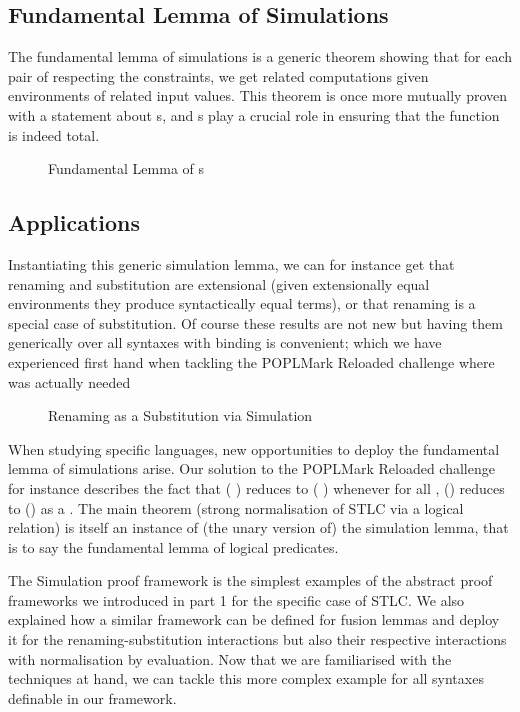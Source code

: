
\subsection{Fundamental Lemma of Simulations}

The fundamental lemma of simulations is a generic theorem showing that for
each pair of  respecting the  constraints, we
get related computations given environments of related input values. This
theorem is once more mutually proven with a statement about s,
and s play a crucial role in ensuring that the function is indeed total.

\begin{figure}[h]
\caption{Fundamental Lemma of s}
\end{figure}

\subsection{Applications}

Instantiating this generic simulation lemma, we can for instance get
that renaming and substitution are extensional (given extensionally
equal environments they produce syntactically equal terms), or that
renaming is a special case of substitution. Of course these results
are not new but having them generically over all syntaxes with binding
is convenient; which we have experienced first hand when tackling the
POPLMark Reloaded challenge where  was actually needed

\begin{figure}[h]
\caption{Renaming as a Substitution via Simulation}
\end{figure}

When studying specific languages, new opportunities to deploy the
fundamental lemma of simulations arise. Our solution to the POPLMark
Reloaded challenge for instance describes the fact that ({  })
reduces to ({  }) whenever for all ,
() reduces to () as a .
The main theorem (strong normalisation of STLC via a logical relation)
is itself an instance of (the unary version of) the simulation lemma,
that is to say the fundamental lemma of logical predicates.

The Simulation proof framework is the simplest examples of the abstract
proof frameworks we introduced in part 1 for the specific case of STLC.
We also explained how a similar framework can be defined
for fusion lemmas and deploy it for the renaming-substitution interactions
but also their respective interactions with normalisation by evaluation.
Now that we are familiarised with the techniques at hand, we can tackle
this more complex example for all syntaxes definable in our framework.

